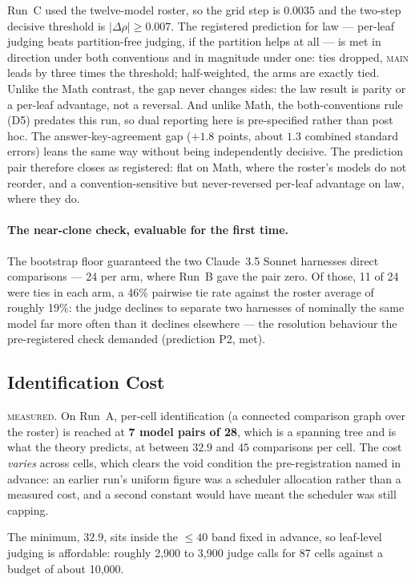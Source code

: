 Run~C used the twelve-model roster, so the grid step is $0.0035$ and
the two-step decisive threshold is $|\Delta\rho| \geq 0.007$. The
registered prediction for law --- per-leaf judging beats partition-free
judging, if the partition helps at all --- is met in direction under
both conventions and in magnitude under one: ties dropped,
\textsc{main} leads by three times the threshold; half-weighted, the
arms are exactly tied. Unlike the Math contrast, the gap never changes
sides: the law result is parity or a per-leaf advantage, not a
reversal. And unlike Math, the both-conventions rule (D5) predates this
run, so dual reporting here is pre-specified rather than post hoc. The
answer-key-agreement gap ($+1.8$ points, about $1.3$ combined standard
errors) leans the same way without being independently decisive. The
prediction pair therefore closes as registered: flat on Math, where the
roster's models do not reorder, and a convention-sensitive but
never-reversed per-leaf advantage on law, where they do.

\paragraph{The near-clone check, evaluable for the first time.} The
bootstrap floor guaranteed the two Claude~3.5 Sonnet harnesses direct
comparisons --- 24 per arm, where Run~B gave the pair zero. Of those,
11 of 24 were ties in each arm, a 46\% pairwise tie rate against the
roster average of roughly 19\%: the judge declines to separate two
harnesses of nominally the same model far more often than it declines
elsewhere --- the resolution behaviour the pre-registered check
demanded (prediction P2, met).

\subsection{Identification Cost}\label{sec:res-cost}

\textsc{measured.} On Run~A, per-cell identification (a connected
comparison graph over the roster) is reached at \textbf{7 model
pairs of 28}, which is a spanning tree and is what the theory predicts,
at between $32.9$ and $45$ comparisons per cell. The cost \emph{varies}
across cells, which clears the void condition the pre-registration
named in advance: an earlier run's uniform figure was a scheduler
allocation rather than a measured cost, and a second constant would
have meant the scheduler was still capping.

The minimum, $32.9$, sits inside the $\leq 40$ band fixed in advance,
so leaf-level judging is affordable: roughly 2{,}900 to 3{,}900 judge
calls for 87 cells against a budget of about 10{,}000.

